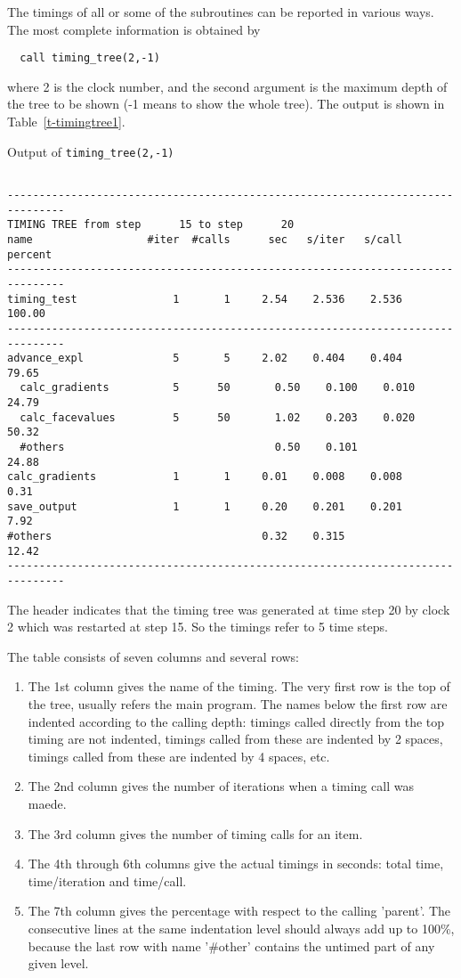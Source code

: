 The timings of all or some of the subroutines can be reported
in various ways. The most complete information is obtained by
\begin{verbatim}
  call timing_tree(2,-1)
\end{verbatim}
where 2 is the clock number, and the second argument is the maximum
depth of the tree to be shown (-1 means to show the whole tree).
The output is shown in Table~\ref{t-timingtree1}.
\begin{table}
\caption{Output of {\tt timing\_tree(2,-1)}}
{\footnotesize
\begin{verbatim}

-------------------------------------------------------------------------------
TIMING TREE from step      15 to step      20
name                  #iter  #calls      sec   s/iter   s/call  percent
-------------------------------------------------------------------------------
timing_test               1       1     2.54    2.536    2.536   100.00
-------------------------------------------------------------------------------
advance_expl              5       5     2.02    0.404    0.404    79.65
  calc_gradients          5      50       0.50    0.100    0.010    24.79
  calc_facevalues         5      50       1.02    0.203    0.020    50.32
  #others                                 0.50    0.101             24.88
calc_gradients            1       1     0.01    0.008    0.008     0.31
save_output               1       1     0.20    0.201    0.201     7.92
#others                                 0.32    0.315             12.42
-------------------------------------------------------------------------------

\end{verbatim}
}
\label{t-timingtree1}
\end{table}
The header indicates that the timing tree was generated at time step 20
by clock 2 which was restarted at step 15. So the timings refer to
5 time steps. 

The table consists of seven columns and several rows:
\begin{enumerate}
\item 
The 1st column gives the name of the timing. 
    The very first row is the top of the tree, usually refers the main program.
    The names below the first row are indented according to the calling depth:
    timings called directly from the top timing are not indented, 
    timings called from these are indented by 2 spaces, 
    timings called from these are indented by 4 spaces, etc.
\item
The 2nd column gives the number of iterations when a timing call was maede.
\item
The 3rd column gives the number of timing calls for an item.
\item
The 4th through 6th columns give the actual timings in seconds: 
    total time, time/iteration and time/call.
\item
The 7th column gives the percentage with respect to the 
    calling 'parent'. The consecutive lines at the
    same indentation level should always add up to 100\%, because
    the last row with name '\#other' contains the untimed part of any 
    given level.
\end{enumerate}

